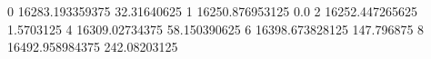 0 16283.193359375 32.31640625
1 16250.876953125 0.0
2 16252.447265625 1.5703125
4 16309.02734375 58.150390625
6 16398.673828125 147.796875
8 16492.958984375 242.08203125
